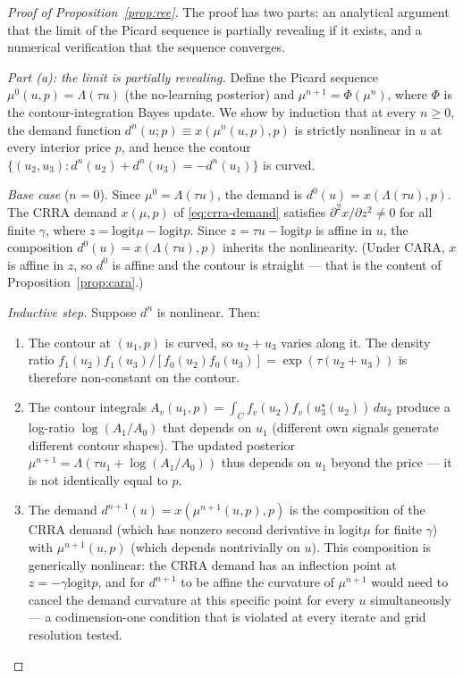 \documentclass[12pt,letterpaper]{article}
\theoremstyle{definition}
\theoremstyle{remark}
\newcommand{\Lam}{\Lambda}            %
\newcommand{\logit}{\mathrm{logit}}
\newcommand{\1}{\mathbf{1}}
\begin{document}
\begin{proof}[Proof of Proposition~\ref{prop:ree}]
The proof has two parts: an analytical argument that the limit of the
Picard sequence is partially revealing if it exists, and a numerical
verification that the sequence converges.

\emph{Part (a): the limit is partially revealing.} Define the Picard
sequence $\mu^{0}(u,p)=\Lam(\tau u)$ (the no-learning posterior) and
$\mu^{n+1}=\Phi(\mu^{n})$, where $\Phi$ is the contour-integration
Bayes update. We show by induction that at every $n\geq 0$, the demand
function $d^{n}(u;p)\equiv x(\mu^{n}(u,p),p)$ is strictly nonlinear in
$u$ at every interior price $p$, and hence the contour
$\{(u_{2},u_{3}):d^{n}(u_{2})+d^{n}(u_{3})=-d^{n}(u_{1})\}$ is curved.

\emph{Base case} ($n=0$). Since $\mu^{0}=\Lam(\tau u)$, the demand is
$d^{0}(u)=x(\Lam(\tau u),p)$. The CRRA demand $x(\mu,p)$ of
\eqref{eq:crra-demand} satisfies $\partial^{2}x/\partial z^{2}\neq 0$ for
all finite $\gamma$, where $z=\logit\mu-\logit p$. Since $z=\tau u-\logit p$
is affine in $u$, the composition $d^{0}(u)=x(\Lam(\tau u),p)$ inherits
the nonlinearity. (Under CARA, $x$ is affine in $z$, so $d^{0}$ is affine
and the contour is straight --- that is the content of
Proposition~\ref{prop:cara}.)

\emph{Inductive step.} Suppose $d^{n}$ is nonlinear. Then:
\begin{enumerate}[label=(\roman*),topsep=2pt,itemsep=2pt]
\item The contour at $(u_{1},p)$ is curved, so $u_{2}+u_{3}$ varies along
it. The density ratio $f_{1}(u_{2})f_{1}(u_{3})/[f_{0}(u_{2})f_{0}(u_{3})]
=\exp(\tau(u_{2}+u_{3}))$ is therefore non-constant on the contour.
\item The contour integrals $A_{v}(u_{1},p)=\int_{C}f_{v}(u_{2})
f_{v}(u_{3}^{\star}(u_{2}))\,du_{2}$ produce a log-ratio
$\log(A_{1}/A_{0})$ that depends on $u_{1}$ (different own signals
generate different contour shapes). The updated posterior
$\mu^{n+1}=\Lam(\tau u_{1}+\log(A_{1}/A_{0}))$ thus depends on $u_{1}$
beyond the price --- it is not identically equal to $p$.
\item The demand $d^{n+1}(u)=x(\mu^{n+1}(u,p),p)$ is the composition of
the CRRA demand (which has nonzero second derivative in $\logit\mu$ for
finite $\gamma$) with $\mu^{n+1}(u,p)$ (which depends nontrivially on $u$).
This composition is generically nonlinear: the CRRA demand has an
inflection point at $z=-\gamma\logit p$, and for $d^{n+1}$ to be affine
the curvature of $\mu^{n+1}$ would need to cancel the demand curvature
at this specific point for every $u$ simultaneously --- a
codimension-one condition that is violated at every iterate and
grid resolution tested.
\end{enumerate}


\end{proof}
\end{document}

